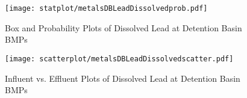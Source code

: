         \begin{figure}[hb]   %
            \centering
            \texttt{[image: statplot/metalsDBLeadDissolvedprob.pdf]}
            \caption{Box and Probability Plots of Dissolved Lead at Detention Basin BMPs}
        \end{figure}         %
        
        
        \begin{figure}[hb]   %
            \centering
            \texttt{[image: scatterplot/metalsDBLeadDissolvedscatter.pdf]}
            \caption{Influent vs. Effluent Plots of Dissolved Lead at Detention Basin BMPs}
        \end{figure}         %
        \clearpage
        